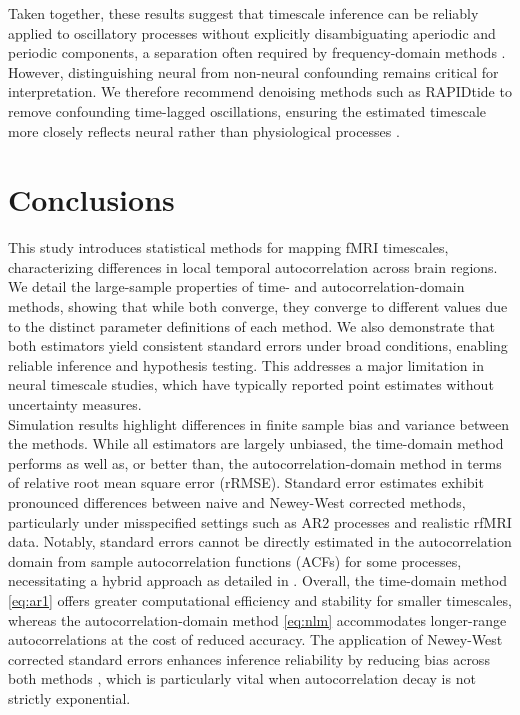 \documentclass[9pt]{article}
\begin{document}
Taken together, these results suggest that timescale inference can be reliably applied to oscillatory processes without explicitly disambiguating aperiodic and periodic components, a separation often required by frequency-domain methods \citep{donoghue_parameterizing_2020, gao_neuronal_2020}. However, distinguishing neural from non-neural confounding remains critical for interpretation. We therefore recommend denoising methods such as RAPIDtide to remove confounding time-lagged oscillations, ensuring the estimated timescale more closely reflects neural rather than physiological processes \citep{frederick_rapidtide_2025}.

\section{Conclusions}
This study introduces statistical methods for mapping fMRI timescales, characterizing differences in local temporal autocorrelation across brain regions. We detail the large-sample properties of time- and autocorrelation-domain methods, showing that while both converge, they converge to different values due to the distinct parameter definitions of each method. We also demonstrate that both estimators yield consistent standard errors under broad conditions, enabling reliable inference and hypothesis testing. This addresses a major limitation in neural timescale studies, which have typically reported point estimates without uncertainty measures.\\

Simulation results highlight differences in finite sample bias and variance between the methods. While all estimators are largely unbiased, the time-domain method performs as well as, or better than, the autocorrelation-domain method in terms of relative root mean square error (rRMSE). Standard error estimates exhibit pronounced differences between naive and Newey-West corrected methods, particularly under misspecified settings such as AR2 processes and realistic rfMRI data. Notably, standard errors cannot be directly estimated in the autocorrelation domain from sample autocorrelation functions (ACFs) for some processes, necessitating a hybrid approach as detailed in . Overall, the time-domain method \eqref{eq:ar1} offers greater computational efficiency and stability for smaller timescales, whereas the autocorrelation-domain method \eqref{eq:nlm} accommodates longer-range autocorrelations at the cost of reduced accuracy. The application of Newey-West corrected standard errors enhances inference reliability by reducing bias across both methods \citep{newey_simple_1987}, which is particularly vital when autocorrelation decay is not strictly exponential.\\
\end{document}
